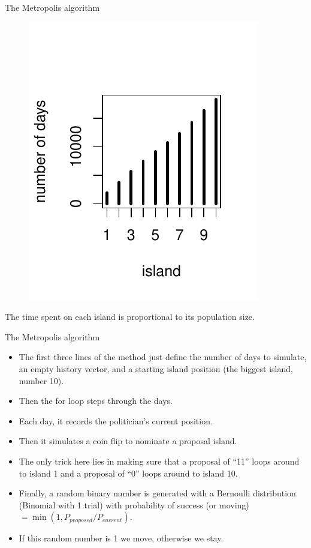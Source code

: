 \documentclass[handout]{beamer}
\begin{document}
\begin{frame}{The Metropolis algorithm}

   \begin{figure}[h!]
	\centering
	\includegraphics[scale=0.92]{pics/mcmc_islands.pdf}
	\end{figure} 

\scriptsize{
	The time spent on each island is proportional to its population size.}
	
\end{frame}



\begin{frame}{The Metropolis algorithm}
\scriptsize{

\begin{itemize}
\item The first three lines of the method just define
the number of days to simulate, an empty history vector, and a starting island position (the biggest island, number 10).
\item Then the for loop steps through the days. 
\item Each day, it records the politician's current position.
\item Then it simulates a coin flip to nominate a proposal island. 
\item The only trick here lies in making sure that a proposal of ``11'' loops around to island 1 and a proposal of “0” loops around to island 10.
\item Finally, a random binary number is generated with a Bernoulli distribution (Binomial with 1 trial) with probability of success (or moving)$=\min(1,P_{proposed}/P_{current})$.
\item If this random number is 1 we move, otherwise we stay.

\end{itemize}


} 
\end{frame}
\end{document}
